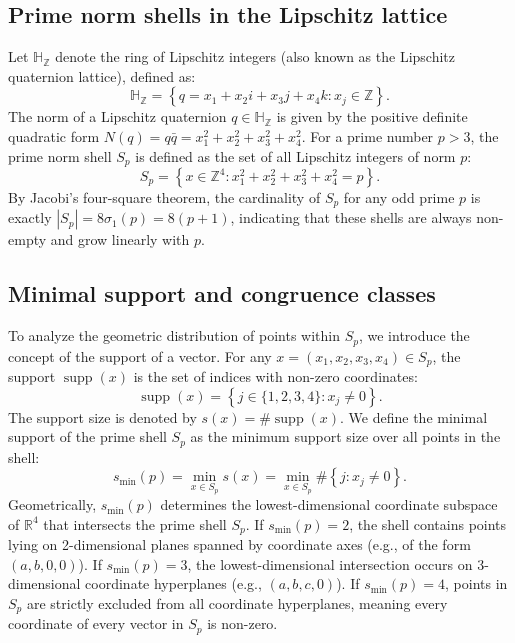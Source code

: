 \documentclass[11pt,a4paper]{article}
\theoremstyle{definition}
\begin{document}
	\subsection{Prime norm shells in the Lipschitz lattice}
	Let $\mathbb{H}_{\mathbb{Z}}$ denote the ring of Lipschitz integers (also known as the Lipschitz quaternion lattice), defined as:
	\begin{equation}
		\mathbb{H}_{\mathbb{Z}} = \left\{ q = x_1 + x_2 i + x_3 j + x_4 k : x_j \in \mathbb{Z} \right\}.
	\end{equation}
	The norm of a Lipschitz quaternion $q \in \mathbb{H}_{\mathbb{Z}}$ is given by the positive definite quadratic form $N(q) = q\bar{q} = x_1^2 + x_2^2 + x_3^2 + x_4^2$. For a prime number $p > 3$, the prime norm shell $S_p$ is defined as the set of all Lipschitz integers of norm $p$:
	\begin{equation}
		S_p = \left\{ x \in \mathbb{Z}^4 : x_1^2 + x_2^2 + x_3^2 + x_4^2 = p \right\}.
	\end{equation}
	By Jacobi's four-square theorem, the cardinality of $S_p$ for any odd prime $p$ is exactly $|S_p| = 8\sigma_1(p) = 8(p+1)$, indicating that these shells are always non-empty and grow linearly with $p$.
	
	\subsection{Minimal support and congruence classes}
	To analyze the geometric distribution of points within $S_p$, we introduce the concept of the support of a vector. For any $x = (x_1, x_2, x_3, x_4) \in S_p$, the support $\operatorname{supp}(x)$ is the set of indices with non-zero coordinates:
	\begin{equation}
		\operatorname{supp}(x) = \left\{ j \in \{1, 2, 3, 4\} : x_j \neq 0 \right\}.
	\end{equation}
	The support size is denoted by $s(x) = \#\operatorname{supp}(x)$. We define the minimal support of the prime shell $S_p$ as the minimum support size over all points in the shell:
	\begin{equation}
		s_{\min}(p) = \min_{x \in S_p} s(x) = \min_{x \in S_p} \#\left\{ j : x_j \neq 0 \right\}.
	\end{equation}
	Geometrically, $s_{\min}(p)$ determines the lowest-dimensional coordinate subspace of $\mathbb{R}^4$ that intersects the prime shell $S_p$. If $s_{\min}(p) = 2$, the shell contains points lying on 2-dimensional planes spanned by coordinate axes (e.g., of the form $(a, b, 0, 0)$). If $s_{\min}(p) = 3$, the lowest-dimensional intersection occurs on 3-dimensional coordinate hyperplanes (e.g., $(a, b, c, 0)$). If $s_{\min}(p) = 4$, points in $S_p$ are strictly excluded from all coordinate hyperplanes, meaning every coordinate of every vector in $S_p$ is non-zero.
	
\end{document}
